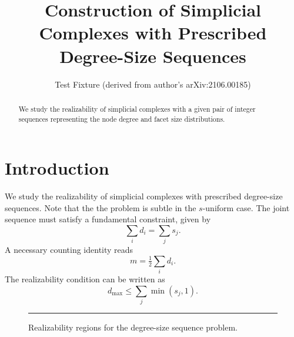 \documentclass[11pt]{article}
\title{Construction of Simplicial Complexes with Prescribed Degree-Size Sequences}
\author{Test Fixture (derived from author's arXiv:2106.00185)}
\begin{document}
\maketitle
\begin{abstract}
We study the realizability of simplicial complexes with a given pair of
integer sequences representing the node degree and facet size distributions.
\end{abstract}
\section{Introduction}
We study the realizability of simplicial complexes with prescribed degree-size
sequences. Note that the the problem is subtle in the $s$-uniform case.
The joint sequence must satisfy a fundamental constraint, given by
\begin{equation}
\sum_{i} d_i = \sum_{j} s_j .
\end{equation}
A necessary counting identity reads
\begin{equation}
m = \tfrac{1}{2}\sum_i d_i .
\end{equation}
The realizability condition can be written as
\begin{equation}
d_{\max} \le \sum_{j} \min(s_j, 1).
\end{equation}
\begin{figure}[h]\centering\rule{3cm}{2cm}
\caption{Realizability regions for the degree-size sequence problem.}
\end{figure}
\end{document}
